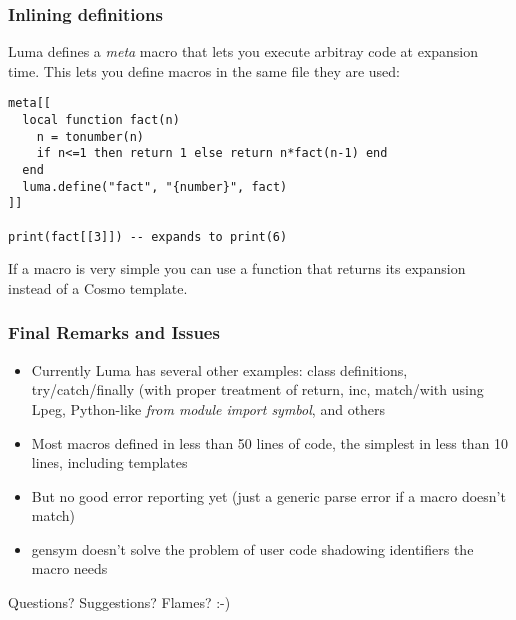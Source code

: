 \documentclass{beamer}
\begin{document}
\begin{frame}[fragile]
\frametitle{Inlining definitions}
Luma defines a \emph{meta} macro that lets you execute arbitray code
at expansion time. This lets you define macros in the same file they
are used:

\begin{verbatim}
meta[[
  local function fact(n)
    n = tonumber(n)
    if n<=1 then return 1 else return n*fact(n-1) end
  end
  luma.define("fact", "{number}", fact) 
]]

print(fact[[3]]) -- expands to print(6)
\end{verbatim}

If a macro is very simple you can use a function that returns
its expansion instead of a Cosmo template.
\end{frame}

\begin{frame}[fragile]
\frametitle{Final Remarks and Issues}
\begin{itemize}
\item Currently Luma has several other examples: class definitions,
try/catch/finally (with proper treatment of return, inc, 
match/with using Lpeg, Python-like \emph{from module import symbol}, and others
\item Most macros defined in less than 50 lines of code, the simplest
in less than 10 lines, including templates
\item But no good error reporting yet (just a generic parse error if
a macro doesn't match)
\item gensym doesn't solve the problem of user code shadowing identifiers the macro needs
\end{itemize}
\end{frame}

\begin{frame}
\begin{center}
Questions? Suggestions? Flames? :-)
\end{center}
\end{frame}
\end{document}
